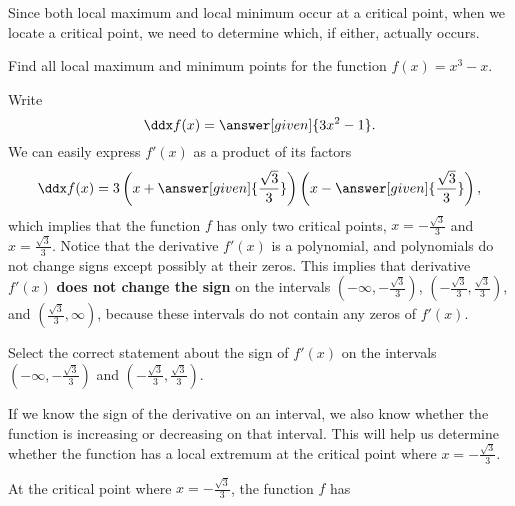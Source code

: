 \documentclass{ximera}
\begin{document}
Since both local maximum and
local minimum occur at a critical point, when we locate a critical point, we need to determine which, if either,
actually occurs. 
\begin{example}
Find all local maximum and minimum points for the function 
$f(x)=x^3-x$. 
\begin{explanation} 
Write
\[
\ddx f(x)=\answer[given]{3x^2-1}.
\] 
We can easily express  $f'(x)$ as a product of its factors
\[
\ddx
f(x)=3\left(x+\answer[given]{\frac{\sqrt{3}}{3}}\right)\left(x-\answer[given]{\frac{\sqrt{3}}{3}}\right),
\] 
which implies that the function $f$ has only two critical points,
$x=-\frac{\sqrt{3}}{3}$ and $x=\frac{\sqrt{3}}{3}$. Notice that the
derivative $f'(x)$ is a polynomial, and polynomials do not change
signs except possibly at their zeros. This implies that derivative
$f'(x)$ \textbf{does not change the sign} on the intervals
$\left(-\infty,-\frac{\sqrt{3}}{3}\right)$,
$\left(-\frac{\sqrt{3}}{3},\frac{\sqrt{3}}{3}\right)$, and
$\left(\frac{\sqrt{3}}{3},\infty\right)$, because these intervals do not contain
any zeros of $f'(x)$.
 
\begin{question}
Select the correct statement about the sign of $f'(x)$ on the
intervals $\left(-\infty,-\frac{\sqrt{3}}{3}\right)$ and
$\left(-\frac{\sqrt{3}}{3},\frac{\sqrt{3}}{3}\right)$. 
\begin{multipleChoice}
\end{multipleChoice}
  \end{question}
  If we know the sign of the derivative on an interval, we also know whether the function is increasing or decreasing on that interval. This will help us determine whether the function has a local extremum at the critical point  where $x=-\frac{\sqrt{3}}{3}$. \\
  \begin{question}

At the critical point where $x=-\frac{\sqrt{3}}{3}$, the function $f$ has  \\
 

\end{question}
\end{explanation}
\end{example}
\end{document}
